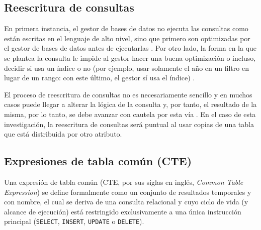 \documentclass[12pt, letter paper]{report}
\begin{document}
      \subsection{Reescritura de consultas} %
      \label{sub:reescritura_de_consultas}
        En primera instancia, el gestor de bases de datos no ejecuta las
        consultas como están escritas en el lenguaje de alto nivel, sino que
        primero son optimizadas por el gestor de bases de datos antes de
        ejecutarlas \cite{silberschatz2019database}. Por otro lado, la forma
        en la que se plantea la consulta le impide al gestor hacer una buena
        optimización o incluso, decidir si usa un índice o no (por ejemplo,
        usar solamente el año en un filtro en lugar de un rango: con este
        último, el gestor sí usa el índice) \cite{ramakrishnan2003database}.

        El proceso de reescritura de consultas no es necesariamente sencillo y
        en muchos casos puede llegar a alterar la lógica de la consulta y, por
        tanto, el resultado de la misma, por lo tanto, se debe avanzar con
        cautela por esta vía \cite{ramakrishnan2003database,
        chaudhuri1998overview, date2012database}. En el caso de esta
        investigación, la reescritura de consultas será puntual al usar copias
        de una tabla que está distribuida por otro atributo.

      \subsection{Expresiones de tabla común (CTE)} %
      \label{sub:expresiones_de_tabla_comun_cte}
        Una expresión de tabla común (CTE, por sus siglas en inglés,
        \textit{Common Table Expression}) se define formalmente como un conjunto
        de resultados temporales y con nombre, el cual se deriva de una consulta
        relacional y cuyo ciclo de vida (y alcance de ejecución) está
        restringido exclusivamente a una única instrucción principal
        (\texttt{SELECT}, \texttt{INSERT}, \texttt{UPDATE} o \texttt{DELETE}).
\end{document}
